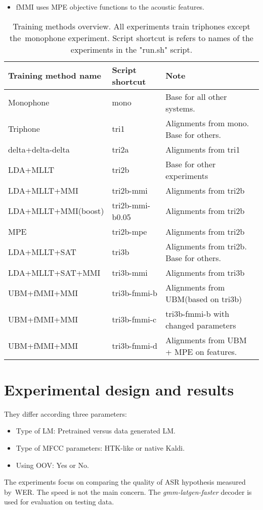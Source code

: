 {\begin{itemize}
    \item \cite{povey2005fmpe} \ac{fMMI} uses \ac{MPE} objective functions to the acoustic features.
\end{itemize}
\begin{table}[!htp]\label{tab:disc_train}
\small{\begin{tabular}{lll}
\hline
Training method name & Script shortcut & Note\\
\hline
Monophone & mono & Base for all other systems.\\
Triphone  & tri1 &  Alignments from mono. Base for others.\\
delta+delta-delta & tri2a & Alignments from tri1 \\
\ac{LDA}+\ac{MLLT} & tri2b &  Base for other experiments \\
\ac{LDA}+\ac{MLLT}+\ac{MMI} & tri2b-mmi & Alignments from tri2b \\
\ac{LDA}+\ac{MLLT}+\ac{MMI}(boost) & tri2b-mmi-b0.05  & Alignments from tri2b \\
\ac{MPE} & tri2b-mpe & Alignments from tri2b \\
\ac{LDA}+\ac{MLLT}+\ac{SAT} & tri3b & Alignments from tri2b. Base for others. \\
\ac{LDA}+\ac{MLLT}+\ac{SAT}+\ac{MMI} & tri3b-mmi  & Alignments from tri3b \\
\ac{UBM}+\ac{fMMI}+\ac{MMI} & tri3b-fmmi-b & Alignments from \ac{UBM}(based on tri3b) \\
\ac{UBM}+\ac{fMMI}+\ac{MMI} & tri3b-fmmi-c & tri3b-fmmi-b with changed parameters \\
\ac{UBM}+\ac{fMMI}+\ac{MMI} & tri3b-fmmi-d & Alignments from \ac{UBM} + \ac{MPE} on features.\\ 
\end{tabular}}
\caption{Training methods overview. All experiments train triphones except the~monophone experiment. Script shortcut is refers to names of the experiments in the "run.sh" script.}
\end{table}


\section{Experimental design and results} 
\label{sec:exps}
They differ according three parameters:
\begin{itemize}
    \item Type of \ac{LM}: Pretrained versus data generated \ac{LM}.
    \item Type of \ac{MFCC} parameters: \ac{HTK}-like or native Kaldi.
    \item Using \ac{OOV}: Yes or No.
\end{itemize}
The experiments focus on comparing the quality of ASR hypothesis measured by~\ac{WER}.
The speed is not the main concern.  The {\it gmm-latgen-faster} decoder is used for evaluation on testing data. 

}
